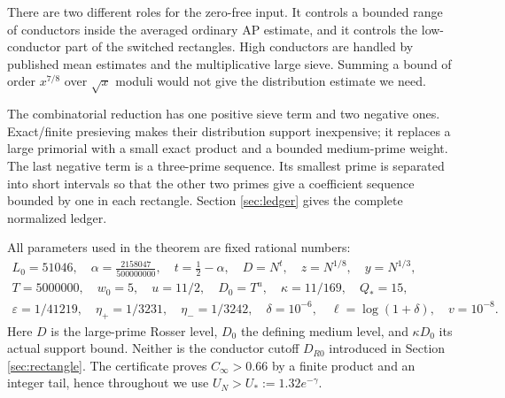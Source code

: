 \documentclass[11pt]{article}
\theoremstyle{remark}\newtheorem{remark}[theorem]{Remark}
\newcommand{\eps}{\varepsilon}
\begin{document}
There are two different roles for the zero-free input. It controls a
bounded range of conductors inside the averaged ordinary AP estimate, and
it controls the low-conductor part of the switched rectangles.
High conductors are handled by published mean estimates and the
multiplicative large sieve. Summing a bound of order $x^{7/8}$ over
$\sqrt{x}$ moduli would not give the distribution estimate we need.

The combinatorial reduction has one positive sieve term and two negative
ones. Exact/finite presieving makes their distribution support inexpensive;
it replaces a large primorial with a small exact product and a bounded
medium-prime weight. The last negative term is a three-prime sequence.
Its smallest prime is separated into short intervals so that the other
two primes give a coefficient sequence bounded by one in each rectangle.
Section \ref{sec:ledger} gives the complete normalized ledger.

All parameters used in the theorem are fixed rational numbers:
\begin{equation}\label{eq:parameters}
\begin{gathered}
L_0=51046,\quad \alpha=\frac{2158047}{500000000},\quad
t=\frac12-\alpha,\quad D=N^t,\quad z=N^{1/8},\quad y=N^{1/3},\\
T=5000000,\quad w_0=5,\quad u=11/2,\quad D_0=T^u,\quad
\kappa=11/169,\quad Q_*=15,\\
\eps=1/41219,\quad \eta_+=1/3231,\quad \eta_-=1/3242,\quad
\delta=10^{-6},\quad \ell=\log(1+\delta),\quad v=10^{-8}.
\end{gathered}
\end{equation}
Here $D$ is the large-prime Rosser level, $D_0$ the defining medium level,
and $\kappa D_0$ its actual support bound. Neither is the conductor cutoff
$D_{R0}$ introduced in Section \ref{sec:rectangle}.
The certificate proves $C_\infty>0.66$ by a finite product and an integer
tail, hence throughout we use $U_N>U_*:=1.32e^{-\gamma}$.
\end{document}
